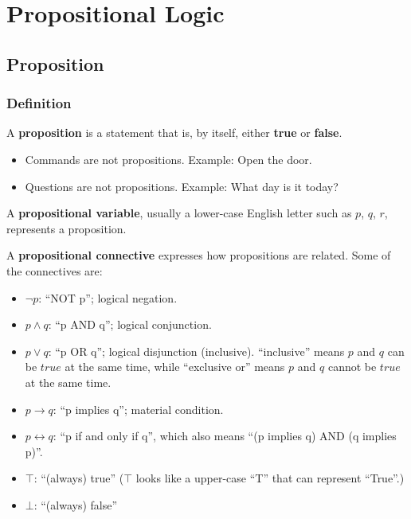 \documentclass[12pt, letterpaper, oneside]{book}
\begin{document}
%
%

\chapter{Propositional Logic}

\section{Proposition}

\subsection{Definition}

A \textbf{proposition} is a statement that is, by itself, either \textbf{true}
or \textbf{false}.
\begin{itemize}
  \item Commands are not propositions. Example: Open the door.
  \item Questions are not propositions. Example: What day is it today?
\end{itemize}

A \textbf{propositional variable}, usually a lower-case English letter such as
$p$, $q$, $r$, represents a proposition.

A \textbf{propositional connective} expresses how propositions are related.
Some of the connectives are:
\begin{itemize}
  \item $\lnot p$: ``NOT p''; logical negation.
  \item $p \land q$: ``p AND q''; logical conjunction.
  \item $p \lor q$: ``p OR q''; logical disjunction (inclusive). ``inclusive''
        means $p$ and $q$ can be $true$ at the same time, while ``exclusive or''
        means $p$ and $q$ cannot be $true$ at the same time.
  \item $p \rightarrow q$: ``p implies q''; material condition.
  \item $p \leftrightarrow q$: ``p if and only if q'', which also means ``(p
        implies q) AND (q implies p)''.
  \item $\top$: ``(always) true'' ($\top$ looks like a upper-case ``T'' that
        can represent ``True''.)
  \item $\bot$: ``(always) false''
\end{itemize}
\end{document}
